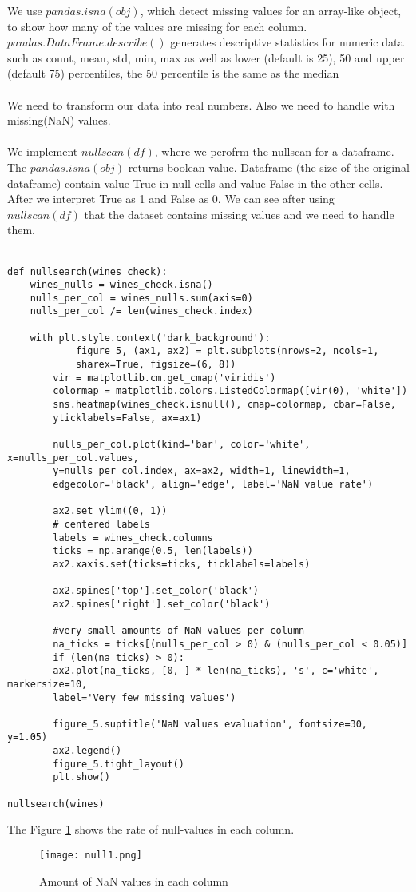 \documentclass[a4paper, twoside, english]{article}
\begin{document}
\newpage

We use $pandas.isna(obj)$, which detect missing values for an array-like object, to show how many of the values are
missing for each column. $pandas.DataFrame.describe()$ generates descriptive statistics  for numeric data such as count, mean, std, min, max as well as lower (default is 25), 50 and upper (default 75) percentiles, the 50 percentile is the same as the median ~\cite{Pandas}\\
~\\
We need to transform our data into real numbers. Also we need to  handle with missing(NaN) values.\\
~\\
We implement $nullscan(df)$, where we perofrm the nullscan for a dataframe. The $pandas.isna(obj)$ returns boolean value. Dataframe (the size of the original dataframe) contain value True in null-cells and value False in the other cells. After we interpret True as 1 and False  as 0. We can see after using $nullscan(df)$ that the dataset contains missing values and we need to handle them.\\
~\\
\begin{lstlisting}[language=iPython]
def nullsearch(wines_check):
	wines_nulls = wines_check.isna()
	nulls_per_col = wines_nulls.sum(axis=0)
	nulls_per_col /= len(wines_check.index)
	
	with plt.style.context('dark_background'):
			figure_5, (ax1, ax2) = plt.subplots(nrows=2, ncols=1, 
			sharex=True, figsize=(6, 8))
		vir = matplotlib.cm.get_cmap('viridis')
		colormap = matplotlib.colors.ListedColormap([vir(0), 'white'])
		sns.heatmap(wines_check.isnull(), cmap=colormap, cbar=False, 
		yticklabels=False, ax=ax1)
		
		nulls_per_col.plot(kind='bar', color='white', x=nulls_per_col.values,
		y=nulls_per_col.index, ax=ax2, width=1, linewidth=1,
		edgecolor='black', align='edge', label='NaN value rate')
		
		ax2.set_ylim((0, 1))
		# centered labels
		labels = wines_check.columns
		ticks = np.arange(0.5, len(labels))
		ax2.xaxis.set(ticks=ticks, ticklabels=labels)
		
		ax2.spines['top'].set_color('black')
		ax2.spines['right'].set_color('black')
		
		#very small amounts of NaN values per column
		na_ticks = ticks[(nulls_per_col > 0) & (nulls_per_col < 0.05)]
		if (len(na_ticks) > 0):
		ax2.plot(na_ticks, [0, ] * len(na_ticks), 's', c='white', markersize=10,
		label='Very few missing values')
		
		figure_5.suptitle('NaN values evaluation', fontsize=30, y=1.05)
		ax2.legend()
		figure_5.tight_layout()
		plt.show()

nullsearch(wines)
\end{lstlisting}
\newpage
The Figure \ref{fig:null1} shows the rate of null-values in each column.\\
\begin{figure}[h!]
	\centerline{\texttt{[image: null1.png]}}
	\caption[null]{Amount of NaN values in each column}
	\label{fig:null1}
\end{figure}
\end{document}
